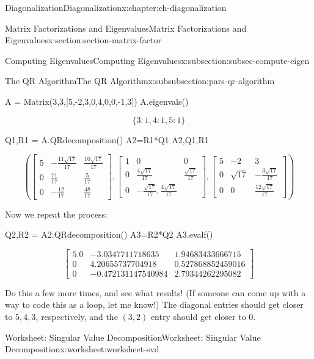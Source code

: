 \documentclass[oneside,10pt,]{book}
\numberwithin{equation}{section}
\newcommand{\bbm}{\begin{bmatrix}}
\newcommand{\ebm}{\end{bmatrix}}
\newcommand{\amp}{&}
\begin{document}
\begin{chapterptx}{Diagonalization}{}{Diagonalization}{}{}{x:chapter:ch-diagonalization}
\begin{sectionptx}{Matrix Factorizations and Eigenvalues}{}{Matrix Factorizations and Eigenvalues}{}{}{x:section:section-matrix-factor}
\begin{subsectionptx}{Computing Eigenvalues}{}{Computing Eigenvalues}{}{}{x:subsection:subsec-compute-eigen}
\begin{subsubsectionptx}{The QR Algorithm}{}{The QR Algorithm}{}{}{x:subsubsection:pars-qr-algorithm}
\begin{sageinput}
A = Matrix(3,3,[5,-2,3,0,4,0,0,-1,3])
A.eigenvals()
\end{sageinput}
\begin{sageoutput}
\[\{3:1, 4:1, 5:1\}\]
\end{sageoutput}
\begin{sageinput}
Q1,R1 = A.QRdecomposition()
A2=R1*Q1
A2,Q1,R1
\end{sageinput}
\begin{sageoutput}
\[\left(\bbm 5\amp -\frac{11\sqrt{17}}{17}\amp \frac{10\sqrt{17}}{17}\\ 0\amp \frac{71}{17} \amp \frac{5}{17}\\ 0\amp -\frac{12}{17} \amp \frac{48}{17}\ebm, \bbm 1\amp 0\amp 0\\ 0\amp \frac{4\sqrt{17}}{17} \amp \frac{\sqrt{17}}{17}\\ 0\amp -\frac{\sqrt{17}}{17}, \frac{4\sqrt{17}}{17}\ebm, \bbm 5\amp -2\amp 3\\ 0\amp \sqrt{17}\amp -\frac{3\sqrt{17}}{17}\\ 0\amp 0\amp \frac{12\sqrt{17}}{17}\ebm\right)\]
\end{sageoutput}
Now we repeat the process:%
\begin{sageinput}
Q2,R2 = A2.QRdecomposition()
A3=R2*Q2
A3.evalf()
\end{sageinput}
\begin{sageoutput}
\[\bbm 5.0\amp -3.0347711718635 \amp 1.94683433666715\\ 0\amp 4.20655737704918 \amp 0.527868852459016\\ 0 \amp -0.472131147540984 \amp 2.79344262295082\ebm\]
\end{sageoutput}
Do this a few more times, and see what results! (If someone can come up with a way to code this as a loop, let me know!) The diagonal entries should get closer to \(5,4,3\), respectively, and the \((3,2)\) entry should get closer to \(0\).%
\end{subsubsectionptx}
\end{subsectionptx}
\end{sectionptx}
%
%
\typeout{************************************************}
\typeout{************************************************}
%
\begin{worksheet-section}{Worksheet: Singular Value Decomposition}{}{Worksheet: Singular Value Decomposition}{}{}{x:worksheet:worksheet-svd}

\end{worksheet-section}
\end{chapterptx}
\end{document}
